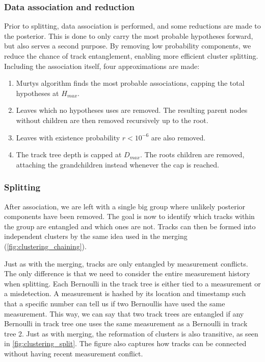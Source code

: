 \subsubsection{Data association and reduction}
Prior to splitting, data association is performed, and some reductions are made to the posterior. This is done to only carry the most probable hypotheses forward, but also serves a second purpose. By removing low probability components, we reduce the chance of track entanglement, enabling more efficient cluster splitting. Including the association itself, four approximations are made:

\begin{enumerate}
    \item Murtys algorithm finds the most probable associations, capping the total hypotheses at $H_{max}$.
    \item Leaves which no hypotheses uses are removed. The resulting parent nodes without children are then removed recursively up to the root.
    \item Leaves with existence probability $r < 10^{-6}$ are also removed.
    \item The track tree depth is capped at $D_{max}$. The roots children are removed, attaching the grandchildren instead whenever the cap is reached.
\end{enumerate}

\subsubsection{Splitting}
After association, we are left with a single big group where unlikely posterior components have been removed. The goal is now to identify which tracks within the group are entangled and which ones are not. Tracks can then be formed into independent clusters by the same idea used in the merging (\autoref{fig:clustering_chaining}). 
\medskip

Just as with the merging, tracks are only entangled by measurement conflicts. The only difference is that we need to consider the entire measurement history when splitting. Each Bernoulli in the track tree is either tied to a measurement or a misdetection. A measurement is hashed by its location and timestamp such that a specific number can tell us if two Bernoullis have used the same measurement. This way, we can say that two track trees are entangled if any Bernoulli in track tree one uses the same measurement as a Bernoulli in track tree 2. Just as with merging, the reformation of clusters is also transitive, as seen in \autoref{fig:clustering_split}. The figure also captures how tracks can be connected without having recent measurement conflict.
\medskip

